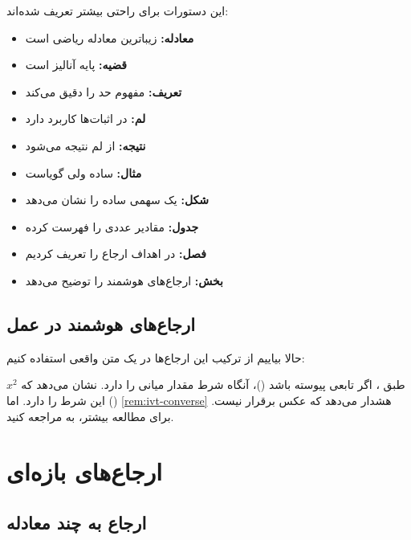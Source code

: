 \documentclass{matinbook}
\begin{document}
این دستورات برای راحتی بیشتر تعریف شده‌اند:

\begin{itemize}
    \item \textbf{معادله:}  زیباترین معادله ریاضی است
    \item \textbf{قضیه:}  پایه آنالیز است
    \item \textbf{تعریف:}  مفهوم حد را دقیق می‌کند
    \item \textbf{لم:}  در اثبات‌ها کاربرد دارد
    \item \textbf{نتیجه:}  از لم نتیجه می‌شود
    \item \textbf{مثال:}  ساده ولی گویاست
    \item \textbf{شکل:}  یک سهمی ساده را نشان می‌دهد
    \item \textbf{جدول:}  مقادیر عددی را فهرست کرده
    \item \textbf{فصل:} در  اهداف ارجاع را تعریف کردیم
    \item \textbf{بخش:}  ارجاع‌های هوشمند را توضیح می‌دهد
\end{itemize}

\section{ارجاع‌های هوشمند در عمل}
\label{sec:smart-refs}

حالا بیاییم از ترکیب این ارجاع‌ها در یک متن واقعی استفاده کنیم:

\medskip

طبق ، اگر تابعی پیوسته باشد
()، آنگاه شرط مقدار میانی را دارد.
 نشان می‌دهد که $x^{2}$
() این شرط را دارد.
اما \ref{rem:ivt-converse} هشدار می‌دهد که عکس
 برقرار نیست.
برای مطالعه بیشتر، به  مراجعه کنید.

\chapter{ارجاع‌های بازه‌ای}
\label{chap:range-refs}

\section{ارجاع به چند معادله}
\end{document}
